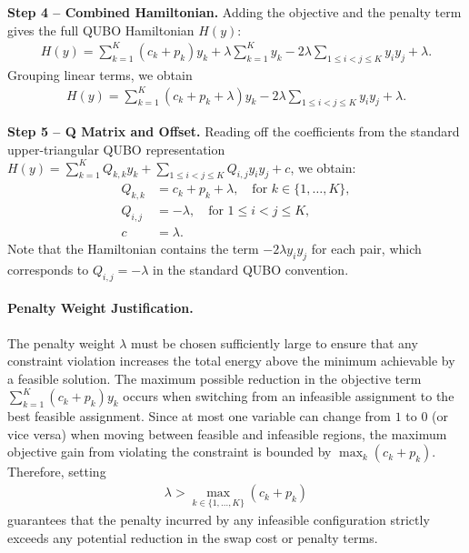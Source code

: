 \documentclass[12pt]{article}
\begin{document}
\textbf{Step 4 -- Combined Hamiltonian.} Adding the objective and the penalty term gives the full QUBO Hamiltonian $H(y)$:
\begin{align}
H(y) = \sum_{k=1}^{K} (c_k + p_k) y_k + \lambda \sum_{k=1}^{K} y_k - 2\lambda \sum_{1 \le i < j \le K} y_i y_j + \lambda.
\end{align}
Grouping linear terms, we obtain
\begin{align}
H(y) = \sum_{k=1}^{K} (c_k + p_k + \lambda) y_k - 2\lambda \sum_{1 \le i < j \le K} y_i y_j + \lambda.
\end{align}

\textbf{Step 5 -- Q Matrix and Offset.} Reading off the coefficients from the standard upper-triangular QUBO representation $H(y) = \sum_{k=1}^{K} Q_{k,k} y_k + \sum_{1 \le i < j \le K} Q_{i,j} y_i y_j + c$, we obtain:
\begin{align}
Q_{k,k} &= c_k + p_k + \lambda, \quad \text{for } k \in \{1, \dots, K\}, \\
Q_{i,j} &= -\lambda, \quad \text{for } 1 \le i < j \le K, \\
c &= \lambda.
\end{align}
Note that the Hamiltonian contains the term $-2\lambda y_i y_j$ for each pair, which corresponds to $Q_{i,j} = -\lambda$ in the standard QUBO convention.

\paragraph{Penalty Weight Justification.}
The penalty weight $\lambda$ must be chosen sufficiently large to ensure that any constraint violation increases the total energy above the minimum achievable by a feasible solution. The maximum possible reduction in the objective term $\sum_{k=1}^{K} (c_k + p_k) y_k$ occurs when switching from an infeasible assignment to the best feasible assignment. Since at most one variable can change from $1$ to $0$ (or vice versa) when moving between feasible and infeasible regions, the maximum objective gain from violating the constraint is bounded by $\max_{k} (c_k + p_k)$. Therefore, setting
\begin{align}
\lambda > \max_{k \in \{1, \dots, K\}} (c_k + p_k)
\end{align}
guarantees that the penalty incurred by any infeasible configuration strictly exceeds any potential reduction in the swap cost or penalty terms.
\end{document}
